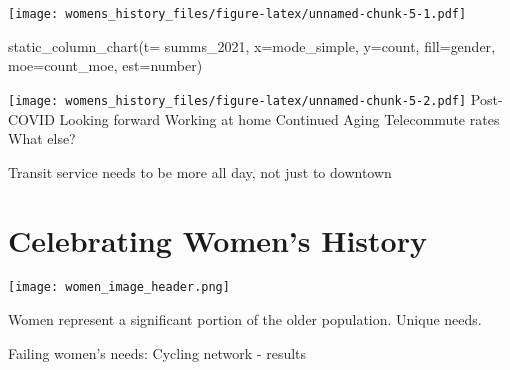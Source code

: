 \documentclass[
  12pt,
]{article}
\newenvironment{Shaded}{\begin{snugshade}}{\end{snugshade}}
\newcommand{\AttributeTok}[1]{\textcolor[rgb]{0.77,0.63,0.00}{#1}}
\newcommand{\FunctionTok}[1]{\textcolor[rgb]{0.00,0.00,0.00}{#1}}
\newcommand{\NormalTok}[1]{#1}
\newcommand{\StringTok}[1]{\textcolor[rgb]{0.31,0.60,0.02}{#1}}
\begin{document}
\texttt{[image: womens\_history\_files/figure-latex/unnamed-chunk-5-1.pdf]}

\begin{Shaded}
\begin{Highlighting}[]
\FunctionTok{static\_column\_chart}\NormalTok{(}\AttributeTok{t=}\NormalTok{ summs\_2021, }\AttributeTok{x=}\StringTok{\textquotesingle{}mode\_simple\textquotesingle{}}\NormalTok{, }\AttributeTok{y=}\StringTok{\textquotesingle{}count\textquotesingle{}}\NormalTok{,  }\AttributeTok{fill=}\StringTok{\textquotesingle{}gender\textquotesingle{}}\NormalTok{, }\AttributeTok{moe=}\StringTok{\textquotesingle{}count\_moe\textquotesingle{}}\NormalTok{, }\AttributeTok{est=}\StringTok{\textquotesingle{}number\textquotesingle{}}\NormalTok{)}
\end{Highlighting}
\end{Shaded}

\texttt{[image: womens\_history\_files/figure-latex/unnamed-chunk-5-2.pdf]}
Post-COVID Looking forward Working at home Continued Aging Telecommute
rates What else?

Transit service needs to be more all day, not just to downtown

\hypertarget{celebrating-womens-history}{%
\section{Celebrating Women's History}\label{celebrating-womens-history}}

\texttt{[image: women\_image\_header.png]}

Women represent a significant portion of the older population. Unique
needs.

Failing women's needs: Cycling network - results
\end{document}
